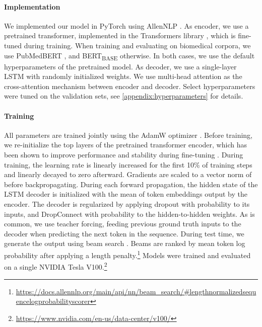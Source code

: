 \documentclass[11pt]{article}
\begin{document}
\paragraph{Implementation} \label{implementation}
We implemented our model in PyTorch \citep{pytorch} using AllenNLP \citep{AllenNLP}. As encoder, we use a pretrained transformer, implemented in the Transformers library \citep{hf-transformers}, which is fine-tuned during training. When training and evaluating on biomedical corpora, we use PubMedBERT \citep{gu2020domain}, and BERT\textsubscript{BASE} \citep{devlin-etal-2019-bert} otherwise. In both cases, we use the default hyperparameters of the pretrained model. As decoder, we use a single-layer LSTM \citep{Hochreiter1997LongSM} with randomly initialized weights. We use multi-head attention \citep{vaswani2017attention} as the cross-attention mechanism between encoder and decoder. Select hyperparameters were tuned on the validation sets, see \autoref{appendix:hyperparameters} for details.

\paragraph{Training} \label{training}

All parameters are trained jointly using the AdamW optimizer \citep{adamw}. Before training, we re-initialize the top  layers of the pretrained transformer encoder, which has been shown to improve performance and stability during fine-tuning \citep{Zhang2021RevisitingFB}. During training, the learning rate is linearly increased for the first 10\% of training steps and linearly decayed to zero afterward. Gradients are scaled to a vector norm of  before backpropagating. During each forward propagation, the hidden state of the LSTM decoder is initialized with the mean of token embeddings output by the encoder. The decoder is regularized by applying dropout \citep{Srivastava2014DropoutAS} with probability  to its inputs, and DropConnect \citep{Wan2013RegularizationON} with probability  to the hidden-to-hidden weights. As is common, we use teacher forcing, feeding previous ground truth inputs to the decoder when predicting the next token in the sequence. During test time, we generate the output using beam search \citep{graves2012sequence}. Beams are ranked by mean token log probability after applying a length penalty.\footnote{\url{https://docs.allennlp.org/main/api/nn/beam_search/\#lengthnormalizedsequencelogprobabilityscorer}} Models were trained and evaluated on a single NVIDIA Tesla V100.\footnote{\url{https://www.nvidia.com/en-us/data-center/v100/}}
\end{document}
